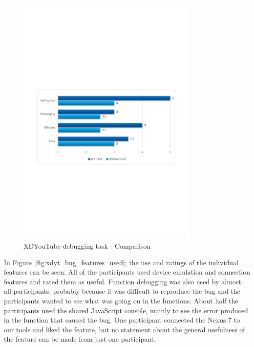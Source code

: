 \begin{figure}[H]
  \centering
    \includegraphics[width=0.8\textwidth]{images/charts/xdyt_bug_comparison.pdf}
	\caption[xdyt-bug: Comparison]{XDYouTube debugging task - Comparison}
	\label{fig:xdyt_bug_comparison}
\end{figure}

In Figure~\ref{fig:xdyt_bug_features_used}; the use and ratings of the individual features can be seen. All of the participants used device emulation and connection features and rated them as useful. Function debugging was also used by almost all participants, probably because it was difficult to reproduce the bug and the participants wanted to see what was going on in the functions. About half the participants used the shared JavaScript console, mainly to see the error produced in the function that caused the bug. One participant connected the Nexus 7 to our tools and liked the feature, but no statement about the general usefulness of the feature can be made from just one participant. 

